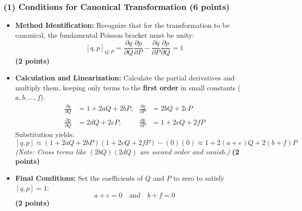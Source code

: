 \documentclass[11pt, a4paper]{article} %
\begin{document}
\subsubsection*{(1) Conditions for Canonical Transformation (6 points)}
\begin{itemize}
    \item \textbf{Method Identification:} Recognize that for the transformation to be canonical, the fundamental Poisson bracket must be unity:
    \[ [q, p]_{Q,P} = \frac{\partial q}{\partial Q}\frac{\partial p}{\partial P} - \frac{\partial q}{\partial P}\frac{\partial p}{\partial Q} = 1 \]
    \hfill \textbf{(2 points)}
    
    \item \textbf{Calculation and Linearization:} Calculate the partial derivatives and multiply them, keeping only terms to the \textbf{first order} in small constants ($a, b, \dots, f$).
    \begin{align*}
        \frac{\partial q}{\partial Q} &= 1 + 2aQ + 2bP, & \frac{\partial q}{\partial P} &= 2bQ + 2cP \\
        \frac{\partial p}{\partial Q} &= 2dQ + 2eP, & \frac{\partial p}{\partial P} &= 1 + 2eQ + 2fP
    \end{align*}
    Substitution yields:
    \[ [q, p] \approx (1 + 2aQ + 2bP)(1 + 2eQ + 2fP) - (0)(0) \approx 1 + 2(a+e)Q + 2(b+f)P \]
    \textit{(Note: Cross terms like $(2bQ)(2dQ)$ are second order and vanish.)}
    \hfill \textbf{(2 points)}
    
    \item \textbf{Final Conditions:} Set the coefficients of $Q$ and $P$ to zero to satisfy $[q, p] = 1$:
    \[ a + e = 0 \quad \text{and} \quad b + f = 0 \]
    \hfill \textbf{(2 points)}
\end{itemize}
\end{document}

